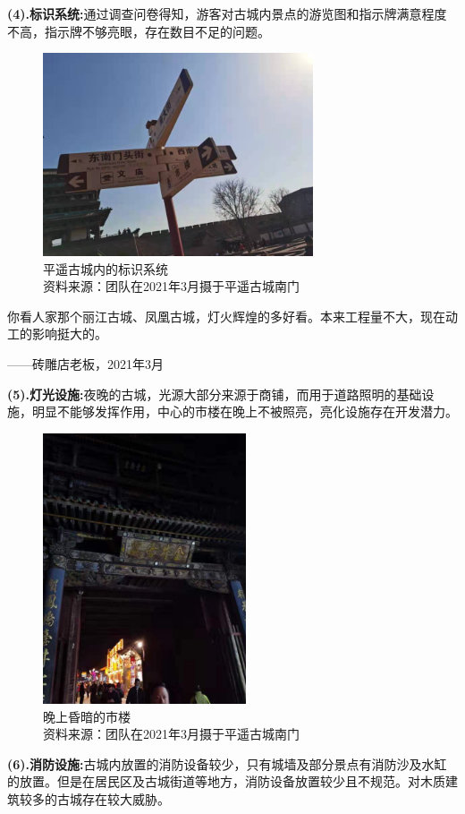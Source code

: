\documentclass[UTF8]{ctexart}
\begin{document}
\textbf{(4).标识系统:}通过调查问卷得知，游客对古城内景点的游览图和指示牌满意程度不高，指示牌不够亮眼，存在数目不足的问题。
\begin{figure}[H]
    \centering
    \includegraphics[width=8cm]{标识.jpg}
    \caption[plain]{平遥古城内的标识系统\\资料来源：团队在2021年3月摄于平遥古城南门}
    \label{fig:my_label}
\end{figure}
你看人家那个丽江古城、凤凰古城，灯火辉煌的多好看。本来工程量不大，现在动工的影响挺大的。
\begin{flushright}
——砖雕店老板，2021年3月
\end{flushright}
\textbf{(5).灯光设施:}夜晚的古城，光源大部分来源于商铺，而用于道路照明的基础设施，明显不能够发挥作用，中心的市楼在晚上不被照亮，亮化设施存在开发潜力。
\begin{figure}[H]
    \centering
    \includegraphics[width=6cm]{市楼亮化.jpg}
    \caption[plain]{晚上昏暗的市楼\\资料来源：团队在2021年3月摄于平遥古城南门}
    \label{fig:my_label}
\end{figure}
\textbf{(6).消防设施:}古城内放置的消防设备较少，只有城墙及部分景点有消防沙及水缸的放置。但是在居民区及古城街道等地方，消防设备放置较少且不规范。对木质建筑较多的古城存在较大威胁。
\end{document}
